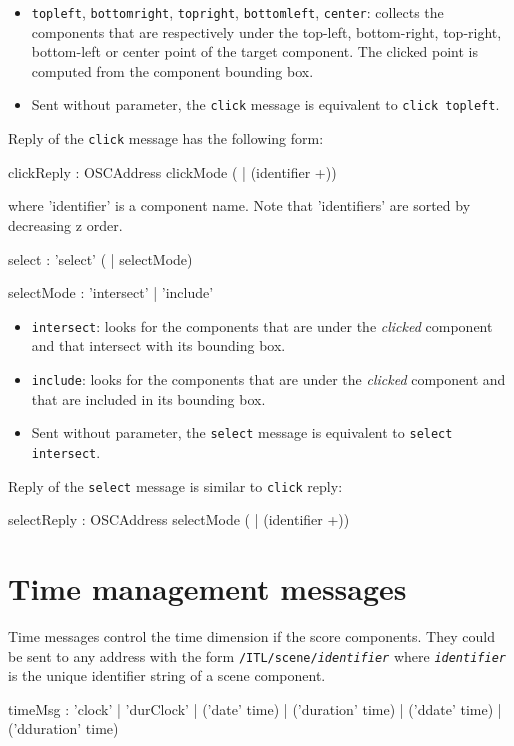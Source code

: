\documentclass[a4paper,twoside]{report}
\newcommand{\toplevel}[1]	{\chapter{#1}}
\newcommand{\OSC}[1]		{\texttt{#1}}
\begin{document}
 
\begin{itemize}
\item \OSC{topleft}, \OSC{bottomright}, \OSC{topright}, \OSC{bottomleft}, \OSC{center}: collects the components that are respectively under the top-left, bottom-right, top-right, bottom-left or center point of the target component. The clicked point is computed from the component bounding box.
\item Sent without parameter, the \OSC{click} message is equivalent to \OSC{click topleft}.
\end{itemize}

Reply of the \OSC{click} message has the following form:
\begin{rail}
clickReply :	OSCAddress	clickMode ( | (identifier +))
\end{rail}

where 'identifier' is a component name. Note that 'identifiers' are sorted by decreasing z order.

\begin{rail}
select :	'select' ( 	| selectMode)
\end{rail}
 
\begin{rail}
selectMode :	'intersect' | 'include'
\end{rail}

\begin{itemize}
\item \OSC{intersect}: looks for the components that are under the \emph{clicked} component and that intersect with its bounding box.
\item \OSC{include}: looks for the components that are under the \emph{clicked} component and that are included in its bounding box.
\item Sent without parameter, the \OSC{select} message is equivalent to \OSC{select intersect}.
\end{itemize}

Reply of the \OSC{select} message is similar to \OSC{click} reply:
\begin{rail}
selectReply :	OSCAddress	selectMode ( | (identifier +))
\end{rail}


\toplevel{Time management messages}
\label{time}
Time messages control the time dimension if the score components. They could be sent to any address with the form \OSC{/ITL/scene/\textit{identifier}} where \OSC{\textit{identifier}} is the unique identifier string of a scene component.
\begin{rail}
timeMsg : 'clock'
		| 'durClock' 
		| ('date' time)
		| ('duration' time) 
		| ('ddate' time) 
		| ('dduration' time) 
\end{rail}
\end{document}
